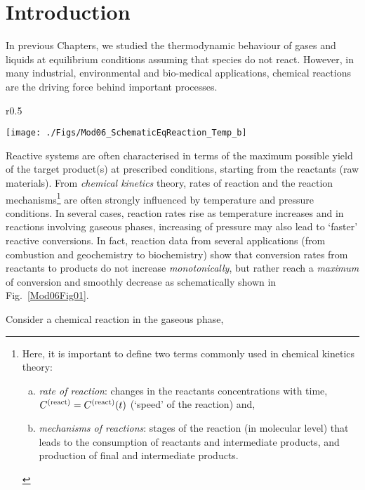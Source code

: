 \section{Introduction}\label{Chapter:ChemicalReactions:Section:Introduction}
In previous Chapters, we studied the thermodynamic behaviour of gases and liquids at equilibrium conditions assuming that species do not react. However, in many industrial, environmental and bio-medical applications, chemical reactions are the driving force behind important processes.
      \begin{wrapfigure}{r}{0.5\textwidth}%
         \begin{center}
           \texttt{[image: ./Figs/Mod06\_SchematicEqReaction\_Temp\_b]}
           \caption{Sketch of equilibrium reaction and temperature.}\label{Mod06Fig01}
         \end{center}
       \end{wrapfigure}%
      Reactive systems are often characterised in terms of the maximum possible yield of the target product(s) at prescribed conditions, starting from the reactants (\ie raw materials). From {\it chemical kinetics} theory, rates of reaction and the reaction mechanisms\footnote{Here, it is important to define two terms commonly used in chemical kinetics theory:
        \begin{enumerate}[a)]
           \item {\it rate of reaction}: changes in the reactants concentrations with time, $\mfr[C]{}{\text{react}}=\mfr[C]{}{\text{react}}(t)$ (\ie `speed' of the reaction) and,
           \item {\it mechanisms of reactions}: stages of the reaction (in molecular level) that leads to the consumption of reactants and intermediate products, and production of final and intermediate products.
        \end{enumerate}
         }
        are often strongly influenced by temperature and pressure conditions. In several cases, reaction rates rise as temperature increases and in reactions involving gaseous phases, increasing of pressure may also lead to `faster' reactive conversions. In fact, reaction data from several applications (from combustion and geochemistry to biochemistry) show that conversion rates from reactants to products do not increase {\it monotonically}, but rather reach a {\it maximum} of conversion and smoothly decrease as schematically shown in Fig.~\ref{Mod06Fig01}.

Consider a chemical reaction in the gaseous phase,


